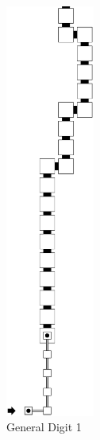 \begin{itemize}
        \begin{figure}[H]
            \centering
            \begin{subfigure}[t]{0.32\textwidth}
                \centering
                \includegraphics[width=0.32\textwidth]{warping_post_warp_general_digit1}
                \caption{\label{fig:post_warp_general_digit1} General Digit 1}
            \end{subfigure}%
            ~
            \begin{subfigure}[t]{0.32\textwidth}
                \centering

\end{subfigure}
\end{figure}
\end{itemize}
